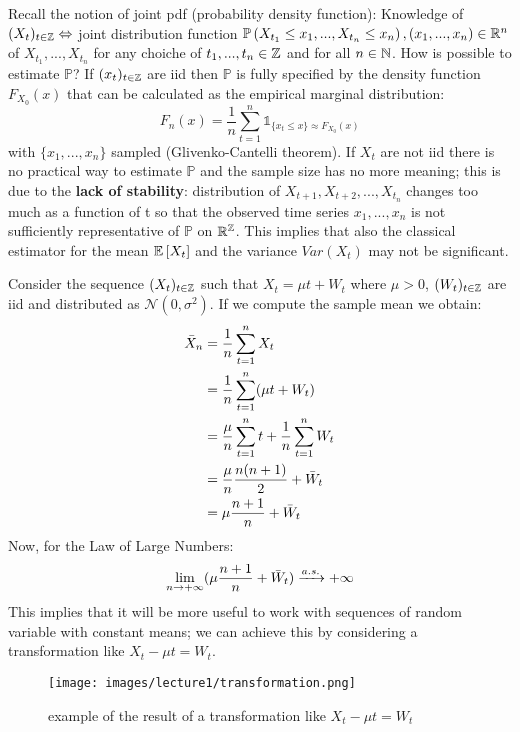 Recall the notion of joint pdf (probability density function):
Knowledge of $(X_t)_{t\in\mathbb{Z}} \Leftrightarrow $ joint distribution function $\mathbb{P}\left(X_{t_1} \le x_1, ..., X_{t_n} \le x_n\right), (x_1, ..., x_n) \in \mathbb{R}^n$ of $X_{t_1}, ..., X_{t_n}$ for any choiche of $t_1, ..., t_n \in \mathbb{Z}$ and for all $n \in \mathbb{N}$.
How is possible to estimate $\mathbb{P}$? If $(x_t)_{t\in\mathbb{Z}}$ are iid then $\mathbb{P}$ is fully specified by the density function $F_{X_0}(x)$ that can be calculated as the empirical marginal distribution:
\[
    F_n(x)=\frac{1}{n}\sum_{t=1}^{n}\mathds{1}_{\{x_t \le x\} \approx F_{X_0}(x)}
\]
with $\{x_1, ..., x_n\}$ sampled (Glivenko-Cantelli theorem). If $X_t$ are not iid there is no practical way to estimate $\mathbb{P}$ and the sample size has no more meaning; this is due to the \textbf{lack of stability}: distribution of $X_{t+1}, X_{t+2}, ..., X_{t_n}$ changes too much as a function of t so that the observed time series $x_1, ..., x_n$ is not sufficiently representative of $\mathbb{P}$ on $\mathbb{R}^{\mathbb{Z}}$. This implies that also the classical estimator for the mean $\mathbb{E}\left[X_t\right]$ and the variance $Var(X_t)$ may not be significant.
\begin{example}
    Consider the sequence $(X_t)_{t\in\mathbb{Z}}$ such that $X_t=\mu t+W_t$ where $\mu > 0$, $(W_t)_{t\in\mathbb{Z}}$ are iid and distributed as $\mathcal{N}(0, \sigma^2)$. If we compute the sample mean we obtain:
    \begin{equation*}
    \begin{split}
        \bar{X}_n &= \frac{1}{n}\sum_{t=1}^{n}X_t\\
        &= \frac{1}{n}\sum_{t=1}^{n}(\mu t+W_t)\\
        &= \frac{\mu}{n}\sum_{t=1}^{n}t + \frac{1}{n}\sum_{t=1}^{n}W_t\\ 
        &= \frac{\mu}{n}\frac{n(n+1)}{2} + \bar{W}_t\\
        &= \mu\frac{n+1}{n} + \bar{W}_t\\
    \end{split}
    \end{equation*}
    Now, for the Law of Large Numbers:
    \[
        \lim_{n\to+\infty}(\mu\frac{n+1}{n} + \bar{W}_t) \xrightarrow{a.s.} +\infty
    \]
    This implies that it will be more useful to work with sequences of random variable with constant means; we can achieve this by considering a transformation like $X_t - \mu t = W_t$.
\end{example}
\begin{figure}[htbp]
    \centering
    \texttt{[image: images/lecture1/transformation.png]}
    \caption{example of the result of a transformation like $X_t - \mu t = W_t$}
\end{figure}

